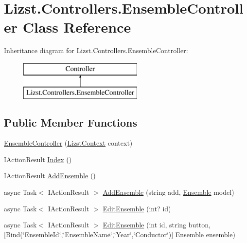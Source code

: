 \hypertarget{class_lizst_1_1_controllers_1_1_ensemble_controller}{}\section{Lizst.\+Controllers.\+Ensemble\+Controller Class Reference}
\label{class_lizst_1_1_controllers_1_1_ensemble_controller}
Inheritance diagram for Lizst.\+Controllers.\+Ensemble\+Controller\+:\begin{figure}[H]
\begin{center}
\leavevmode
\includegraphics[height=2.000000cm]{class_lizst_1_1_controllers_1_1_ensemble_controller}
\end{center}
\end{figure}
\subsection*{Public Member Functions}
\begin{DoxyCompactItemize}
\item 
\mbox{\hyperlink{class_lizst_1_1_controllers_1_1_ensemble_controller_a7b7634158fb0807f47b13c9fb42fce73}{Ensemble\+Controller}} (\mbox{\hyperlink{class_lizst_1_1_models_1_1_lizst_context}{Lizst\+Context}} context)
\item 
I\+Action\+Result \mbox{\hyperlink{class_lizst_1_1_controllers_1_1_ensemble_controller_aaf84c65828533cb459c6dbcb6b58525d}{Index}} ()
\item 
I\+Action\+Result \mbox{\hyperlink{class_lizst_1_1_controllers_1_1_ensemble_controller_a94308622fb69be047dca1299ea6a640c}{Add\+Ensemble}} ()
\item 
async Task$<$ I\+Action\+Result $>$ \mbox{\hyperlink{class_lizst_1_1_controllers_1_1_ensemble_controller_a559424ac9732da0e29c6660343130b3c}{Add\+Ensemble}} (string add, \mbox{\hyperlink{class_lizst_1_1_models_1_1_ensemble}{Ensemble}} model)
\item 
async Task$<$ I\+Action\+Result $>$ \mbox{\hyperlink{class_lizst_1_1_controllers_1_1_ensemble_controller_ab8b5f9c7ffe32b197003c0c02b1cb51e}{Edit\+Ensemble}} (int? id)
\item 
async Task$<$ I\+Action\+Result $>$ \mbox{\hyperlink{class_lizst_1_1_controllers_1_1_ensemble_controller_a306467f530b4521cee89a5cf99a62961}{Edit\+Ensemble}} (int id, string button, \mbox{[}Bind(\char`\"{}Ensemble\+Id\char`\"{},\char`\"{}Ensemble\+Name\char`\"{},\char`\"{}Year\char`\"{},\char`\"{}Conductor\char`\"{})\mbox{]} Ensemble ensemble)
\end{DoxyCompactItemize}
